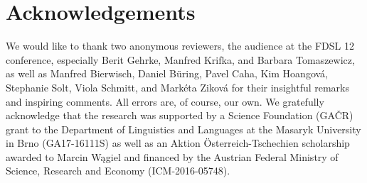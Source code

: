 \documentclass[output=paper,modfonts,hidelinks,newtxmath
\ChapterDOI{10.5281/zenodo.2545513}
]{langscibook}
\begin{document}
\section*{Acknowledgements}
We would like to thank two anonymous reviewers, the audience at the FDSL 12 conference, especially Berit Gehrke, Manfred Krifka, and Barbara Tomaszewicz, as well as Manfred Bierwisch, Daniel Büring, Pavel Caha, Kim Hoangová, Stepha\-nie Solt, Viola Schmitt, and Markéta Ziková for their insightful remarks and inspiring comments. All errors are, of course, our own. We gratefully acknowledge that the research was supported by a  Science Foundation (GAČR) grant to the Department of Linguistics and  Languages at the Masaryk University in Brno (GA17-16111S) as well as an Aktion Österreich-Tschechien scholarship awarded to Marcin Wągiel and financed by the Austrian Federal Ministry of Science, Research and Economy (ICM-2016-05748).

\sloppy
\printbibliography[heading=subbibliography,notkeyword=this]
\end{document}
